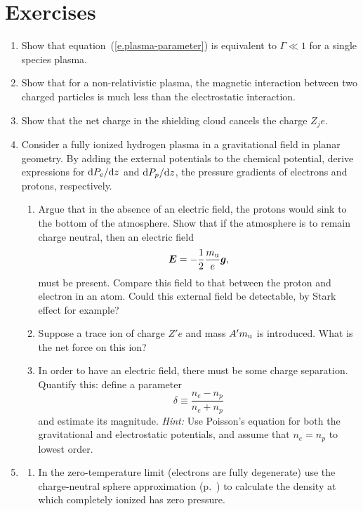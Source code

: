 \section{Exercises}\label{s.plasma-exercises}
\begin{enumerate}
\item Show that equation~(\ref{e.plasma-parameter}) is equivalent to $\Gamma \ll 1$ for a single species plasma.

\item Show that for a non-relativistic plasma, the magnetic interaction between two charged particles is much less than the electrostatic interaction.

\item Show that the net charge in the shielding cloud cancels the charge $Z_{j}e$.

\item Consider a fully ionized hydrogen plasma in a gravitational field in planar geometry. By adding the external potentials to the chemical potential, derive expressions for $\mathrm{d} P_{e}/\mathrm{d} z$ and $\mathrm{d} P_{p}/\mathrm{d} z$, the pressure gradients of electrons and protons, respectively.  
\begin{enumerate}
\item Argue that in the absence of an electric field, the protons would sink to the bottom of the atmosphere. Show that if the atmosphere is to remain charge neutral, then an electric field
\[
	\boldsymbol{E} = -\frac{1}{2}\frac{m_\mathrm{u}}{e}\boldsymbol{g},
\]
must be present. Compare this field to that between the proton and electron in an atom.  Could this external field be detectable, by Stark effect for example?

\item Suppose a trace ion of charge $Z'e$ and mass $A'm_\mathrm{u}$ is	 introduced.  What is the net force on this ion?

\item In order to have an electric field, there must be some charge separation.  Quantify this: define a parameter
\[ \delta \equiv \frac{n_{e}-n_{p}}{n_{e} + n_{p}} \]
and estimate its magnitude.  \emph{Hint:} Use Poisson's equation for both the gravitational and electrostatic potentials, and assume that $n_{e} = n_{p}$ to lowest order.

\end{enumerate}
\item 
\begin{enumerate} 
\item\label{p.zero-pressure-iron} In the zero-temperature limit (electrons are fully degenerate) use the charge-neutral sphere approximation (p.~\pageref{e.madelung-total}) to calculate the density at which completely ionized \iron[56] has zero pressure.


\end{enumerate}
\end{enumerate}
